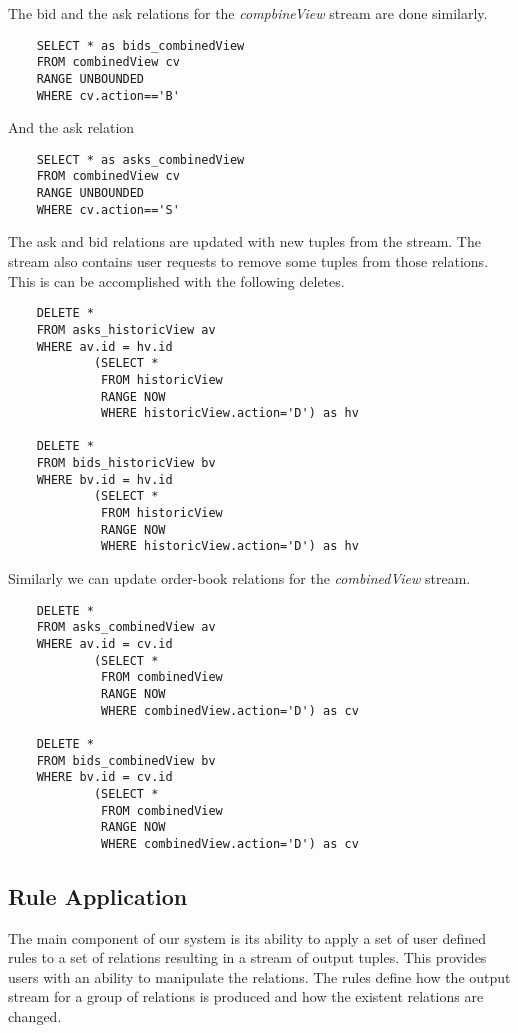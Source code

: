 \documentclass{article}
\begin{document}
\noindent The bid and the ask relations for the \emph{compbineView} stream are done similarly.

\begin{verbatim}  
    SELECT * as bids_combinedView
    FROM combinedView cv
    RANGE UNBOUNDED
    WHERE cv.action=='B'
\end{verbatim}

\noindent And the ask relation

\begin{verbatim}  
    SELECT * as asks_combinedView
    FROM combinedView cv
    RANGE UNBOUNDED
    WHERE cv.action=='S'
\end{verbatim}

\noindent The ask and bid relations are updated with new tuples from the stream. The stream also contains user requests to remove some tuples from those relations. This is can be accomplished with the following deletes.

\begin{verbatim}  
    DELETE *
    FROM asks_historicView av
    WHERE av.id = hv.id
            (SELECT * 
             FROM historicView
             RANGE NOW
             WHERE historicView.action='D') as hv  

    DELETE *
    FROM bids_historicView bv
    WHERE bv.id = hv.id
            (SELECT * 
             FROM historicView
             RANGE NOW
             WHERE historicView.action='D') as hv 
\end{verbatim}

Similarly we can update order-book relations for the \emph{combinedView} stream.

\begin{verbatim}  
    DELETE *
    FROM asks_combinedView av
    WHERE av.id = cv.id
            (SELECT * 
             FROM combinedView
             RANGE NOW
             WHERE combinedView.action='D') as cv  

    DELETE *
    FROM bids_combinedView bv
    WHERE bv.id = cv.id
            (SELECT * 
             FROM combinedView
             RANGE NOW
             WHERE combinedView.action='D') as cv 
\end{verbatim}


\subsection{Rule Application}

The main component of our system is its ability to apply a set of user defined rules to a set of relations resulting in a stream of output tuples. This provides users with an ability to manipulate the relations. The rules define how the output stream for a group of relations is produced and how the existent relations are changed. 
\end{document}
